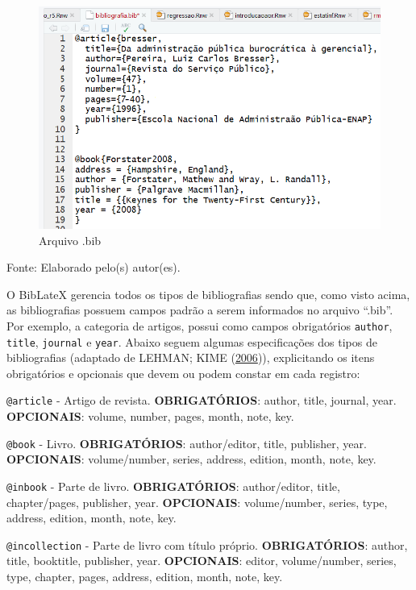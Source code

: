 \documentclass[12pt,portuguese,oneside]{book}
\begin{document}
\begin{figure}[H]

{\centering \includegraphics[width=0.8\linewidth]{rmarkbib} 

}

\caption{Arquivo .bib}\label{fig:rmarkbib}
\end{figure}

Fonte: Elaborado pelo(s) autor(es).

O BibLateX gerencia todos os tipos de bibliografias sendo que, como
visto acima, as bibliografias possuem campos padrão a serem informados
no arquivo ``.bib''. Por exemplo, a categoria de artigos, possui como
campos obrigatórios \texttt{author}, \texttt{title}, \texttt{journal} e
\texttt{year}. Abaixo seguem algumas especificações dos tipos de
bibliografias (adaptado de LEHMAN; KIME
(\protect\hyperlink{ref-biblatex}{2006})), explicitando os itens
obrigatórios e opcionais que devem ou podem constar em cada registro:

\texttt{@article} - Artigo de revista. \textbf{OBRIGATÓRIOS}: author,
title, journal, year. \textbf{OPCIONAIS}: volume, number, pages, month,
note, key.

\texttt{@book} - Livro. \textbf{OBRIGATÓRIOS}: author/editor, title,
publisher, year. \textbf{OPCIONAIS}: volume/number, series, address,
edition, month, note, key.

\texttt{@inbook} - Parte de livro. \textbf{OBRIGATÓRIOS}: author/editor,
title, chapter/pages, publisher, year. \textbf{OPCIONAIS}:
volume/number, series, type, address, edition, month, note, key.

\texttt{@incollection} - Parte de livro com título próprio.
\textbf{OBRIGATÓRIOS}: author, title, booktitle, publisher, year.
\textbf{OPCIONAIS}: editor, volume/number, series, type, chapter, pages,
address, edition, month, note, key.
\end{document}
